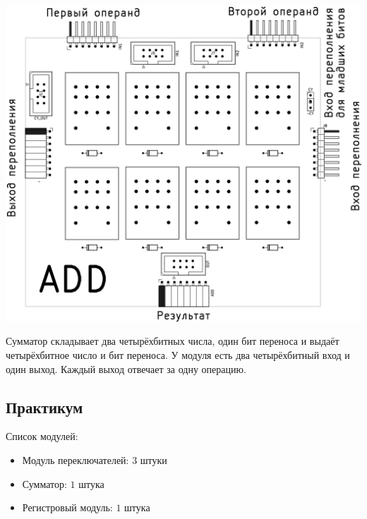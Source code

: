 \begin{center}
\includegraphics{boards/adder.png}
\end{center}

Сумматор складывает два четырёхбитных числа, один бит переноса и выдаёт четырёхбитное число и бит переноса.
У модуля есть два четырёхбитный вход и один выход.
Каждый выход отвечает за одну операцию.




\subsection{Практикум}


Список модулей:
\begin{itemize}
    \item Модуль переключателей: $3$ штуки
    \item Сумматор: $1$ штука
    \item Регистровый модуль: $1$ штука
\end{itemize}

